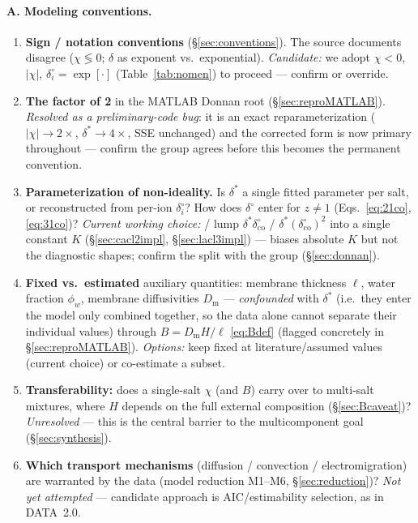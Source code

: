 \documentclass[11pt]{article}
\newcommand{\co}{\mathrm{co}}
\newcommand{\dstar}{\delta^{*}}
\newcommand{\Dm}{D_{\mathrm{m}}}
\begin{document}
\paragraph{A. Modeling conventions.}
\begin{enumerate}[itemsep=3pt,leftmargin=2.2em]
  \item \textbf{Sign / notation conventions} (\S\ref{sec:conventions}). The
        source documents disagree ($\chi\lessgtr0$; $\delta$ as exponent vs.\
        exponential). \emph{Candidate:} we adopt $\chi<0$, $|\chi|$,
        $\delta^{\circ}_i=\exp[\cdot]$ (Table~\ref{tab:nomen}) to proceed ---
        confirm or override.
  \item \textbf{The factor of 2} in the MATLAB Donnan root
        (\S\ref{sec:reproMATLAB}). \emph{Resolved as a preliminary-code bug}:
        it is an exact reparameterization ($|\chi|\to2\times$,
        $\dstar\to4\times$, SSE unchanged) and the corrected form is now
        primary throughout --- confirm the group agrees before this becomes
        the permanent convention.
  \item \textbf{Parameterization of non-ideality.} Is $\dstar$ a single fitted
        parameter per salt, or reconstructed from per-ion
        $\delta^{\circ}_i$? How does $\delta^{\circ}$ enter for $z\ne1$
        (Eqs.~\ref{eq:21co}, \ref{eq:31co})? \emph{Current working choice:}
        \ce{CaCl2}/\ce{LaCl3} lump $\dstar\delta^{\circ}_{\co}$ /
        $\dstar(\delta^{\circ}_{\co})^2$ into a single constant $K$
        (\S\ref{sec:cacl2impl}, \S\ref{sec:lacl3impl}) --- biases absolute
        $K$ but not the diagnostic shapes; confirm the split with the group
        (\S\ref{sec:donnan}).
  \item \textbf{Fixed vs.\ estimated} auxiliary quantities: membrane
        thickness $\ell$, water fraction $\phi_w$, membrane diffusivities
        $\Dm$ --- \emph{confounded} with $\dstar$ (i.e.\ they enter the model
        only combined together, so the data alone cannot separate their
        individual values) through $B=\Dm H/\ell$
        \eqref{eq:Bdef} (flagged concretely in \S\ref{sec:reproMATLAB}).
        \emph{Options:} keep fixed at literature/assumed values (current
        choice) or co-estimate a subset.
  \item \textbf{Transferability:} does a single-salt $\chi$ (and $B$) carry
        over to multi-salt mixtures, where $H$ depends on the full external
        composition (\S\ref{sec:Bcaveat})? \emph{Unresolved} --- this is the
        central barrier to the multicomponent goal (\S\ref{sec:synthesis}).
  \item \textbf{Which transport mechanisms} (diffusion / convection /
        electromigration) are warranted by the data (model reduction M1--M6,
        \S\ref{sec:reduction})? \emph{Not yet attempted} --- candidate
        approach is AIC/estimability selection, as in DATA~2.0.
\end{enumerate}
\end{document}
